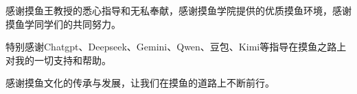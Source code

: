 
\begin{njuacknowledgements}
感谢摸鱼王教授的悉心指导和无私奉献，感谢摸鱼学院提供的优质摸鱼环境，感谢摸鱼学同学们的共同努力。

特别感谢Chatgpt、Deepseek、Gemini、Qwen、豆包、Kimi等指导在摸鱼之路上对我的一切支持和帮助。

感谢摸鱼文化的传承与发展，让我们在摸鱼的道路上不断前行。
\end{njuacknowledgements}
